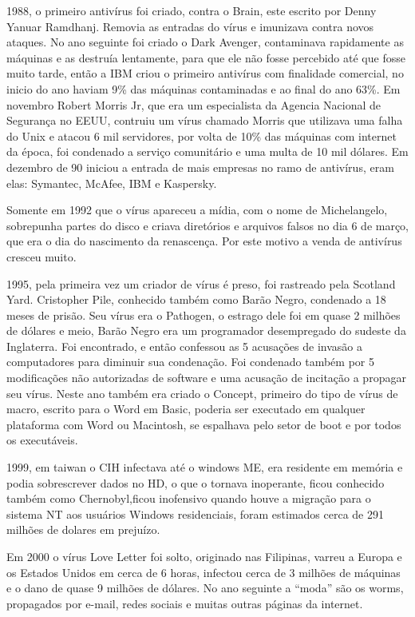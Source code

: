 	1988, o primeiro antivírus foi criado, contra o Brain, este escrito por Denny Yanuar Ramdhanj. Removia as entradas do vírus e imunizava contra novos ataques. No ano seguinte foi criado o Dark Avenger, contaminava rapidamente as máquinas e as destruía lentamente, para que ele não fosse percebido até que fosse muito tarde, então a IBM criou o primeiro antivírus com finalidade comercial, no inicio do ano haviam 9\% das máquinas contaminadas e ao final do ano 63\%. Em novembro Robert Morris Jr, que era um especialista da Agencia Nacional de Segurança no EEUU, contruiu um vírus chamado Morris que utilizava uma falha do Unix e atacou 6 mil servidores, por volta de 10\% das máquinas com internet da época, foi condenado a serviço comunitário e uma multa de 10 mil dólares. Em dezembro de 90 iniciou a entrada de mais empresas no ramo de antivírus, eram elas: Symantec, McAfee, IBM e Kaspersky.


	Somente em 1992 que o vírus apareceu a mídia, com o nome de Michelangelo, sobrepunha partes do disco e criava diretórios e arquivos falsos no dia 6 de março, que era o dia do nascimento da renascença. Por este motivo a venda de antivírus cresceu muito.


	1995, pela primeira vez um criador de vírus é preso, foi rastreado pela Scotland Yard. Cristopher Pile, conhecido também como Barão Negro, condenado a 18 meses de prisão. Seu vírus era o Pathogen, o estrago dele foi em quase 2 milhões de dólares e meio, Barão Negro era um programador desempregado do sudeste da Inglaterra. Foi encontrado, e então confessou as 5 acusações de invasão a computadores para diminuir sua condenação.  Foi condenado também por 5 modificações não autorizadas de software e uma acusação de incitação a propagar seu vírus. Neste ano também era criado o Concept, primeiro do tipo de vírus de macro, escrito para o Word em Basic, poderia ser executado em qualquer plataforma com Word ou Macintosh, se espalhava pelo setor de boot e por todos os executáveis.


	1999, em taiwan  o CIH infectava até o windows ME, era residente em memória e podia sobrescrever dados no HD, o que o tornava inoperante, ficou conhecido também como Chernobyl,ficou inofensivo quando houve a migração para o sistema NT aos usuários Windows residenciais, foram estimados cerca de 291 milhões de dolares em prejuízo.


	Em 2000 o vírus Love Letter foi solto, originado nas Filipinas, varreu a Europa e os Estados Unidos em cerca de 6 horas, infectou cerca de 3 milhões de máquinas e o dano de quase 9 milhões de dólares. No ano seguinte a “moda” são os worms, propagados por e-mail, redes sociais e muitas outras páginas da internet.


